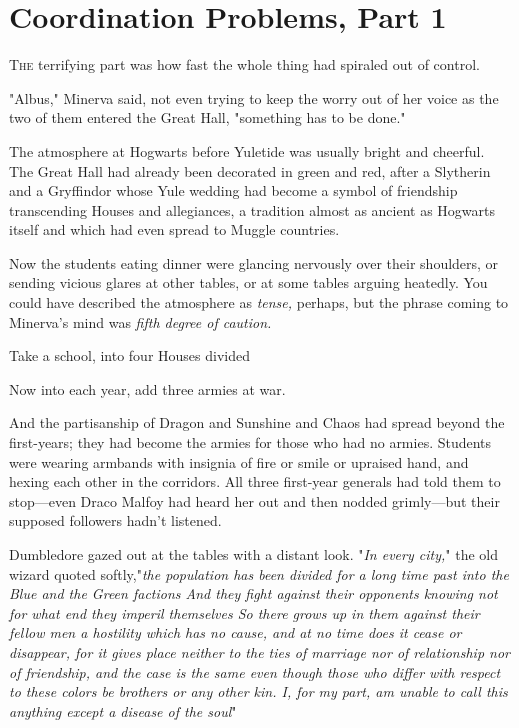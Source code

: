 \chapter{Coordination Problems, Part 1}

\lettrine{T}{he} terrifying part was how fast the whole thing had spiraled out of control.

"Albus," Minerva said, not even trying to keep the worry out of her voice as
the two of them entered the Great Hall, "something has to be done."

The atmosphere at Hogwarts before Yuletide was usually bright and cheerful. The
Great Hall had already been decorated in green and red, after a Slytherin and a
Gryffindor whose Yule wedding had become a symbol of friendship transcending
Houses and allegiances, a tradition almost as ancient as Hogwarts itself and
which had even spread to Muggle countries.

Now the students eating dinner were glancing nervously over their shoulders, or
sending vicious glares at other tables, or at some tables arguing heatedly. You
could have described the atmosphere as \emph{tense,} perhaps, but the phrase
coming to Minerva's mind was \emph{fifth degree of caution.}

Take a school, into four Houses divided{\el}

Now into each year, add three armies at war.

And the partisanship of Dragon and Sunshine and Chaos had spread beyond the
first-years; they had become the armies for those who had no armies. Students
were wearing armbands with insignia of fire or smile or upraised hand, and
hexing each other in the corridors. All three first-year generals had told them
to stop---even Draco Malfoy had heard her out and then nodded grimly---but
their supposed followers hadn't listened.

Dumbledore gazed out at the tables with a distant look. "\emph{In every city,}"
the old wizard quoted softly,"\emph{the population has been divided for a long
time past into the Blue and the Green factions{\el} And they fight against
their opponents knowing not for what end they imperil themselves{\el} So
there grows up in them against their fellow men a hostility which has no cause,
and at no time does it cease or disappear, for it gives place neither to the
ties of marriage nor of relationship nor of friendship, and the case is the
same even though those who differ with respect to these colors be brothers or
any other kin. I, for my part, am unable to call this anything except a disease
of the soul{\el}}"

